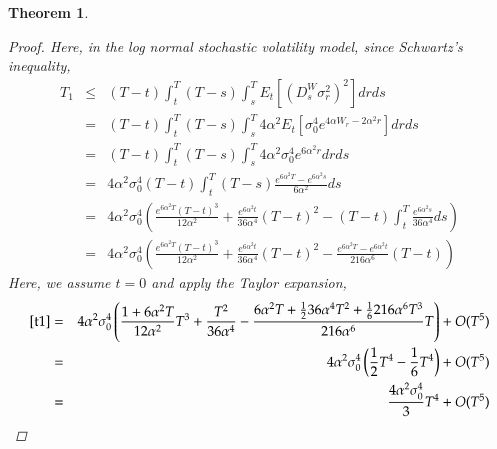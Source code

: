 \documentclass[11pt]{article}
\newtheorem{theorem}{Theorem}
\begin{document}
\begin{theorem}
\begin{proof}
Here, in the log normal stochastic volatility model, since Schwartz's inequality,
\begin{eqnarray}
T_1 
&\le& 
(T-t)\int_{t}^{T}(T-s)\int_{s}^{T}E_{t}\left[\left(D_{s}^{W}\sigma _{r}^{2}\right)^{2}\right] dr ds \nonumber\\
&=&
(T-t)\int_{t}^{T}(T-s)\int_{s}^{T}4\alpha^2 E_{t}\left[ \sigma_0^4 e^{4\alpha W_r - 2\alpha^2 r}\right] dr ds \nonumber\\
&=&
(T-t)\int_{t}^{T}(T-s)\int_{s}^{T}4\alpha^2 \sigma_0^4 e^{6 \alpha^2 r} dr ds \nonumber\\
&=&
4\alpha^2 \sigma_0^4 (T-t)\int_{t}^{T}(T-s)\frac{e^{6 \alpha^2 T} - e^{6 \alpha^2 s}}{6\alpha^2} ds \nonumber\\
&=&
4\alpha^2 \sigma_0^4  \left(\frac{e^{6 \alpha^2 T}(T-t)^3}{12\alpha^2} + \frac{e^{6 \alpha^2 t}}{36\alpha^4}(T-t)^2 - (T-t)\int_t^T \frac{e^{6 \alpha^2 s}}{36\alpha^4}ds \right)\nonumber\\
&=&
4\alpha^2 \sigma_0^4  \left(\frac{e^{6 \alpha^2 T}(T-t)^3}{12\alpha^2} + \frac{e^{6 \alpha^2 t}}{36\alpha^4}(T-t)^2 - \frac{e^{6 \alpha^2 T} - e^{6 \alpha^2 t}}{216\alpha^6}(T-t) \right)\label{t1}
\end{eqnarray}
Here, we assume $t=0$ and apply the Taylor expansion,
\begin{eqnarray}
\eqref{t1}
&=& 
4\alpha^2 \sigma_0^4  \left(\frac{1+6\alpha^2T }{12\alpha^2}T^3 + \frac{T^2}{36\alpha^4} - \frac{6\alpha^2T + \frac{1}{2}36\alpha^4 T^2 + \frac{1}{6}216\alpha^6T^3}{216\alpha^6}T\right) + O(T^5)\nonumber\\
&=& 
4\alpha^2 \sigma_0^4  \left(\frac{1}{2}T^4 - \frac{1}{6}T^4\right) + O(T^5)\nonumber\\
&=& 
\frac{4 \alpha^2 \sigma_0^4}{3}T^4+O(T^5)
\end{eqnarray}


\end{proof}
\end{theorem}
\end{document}
